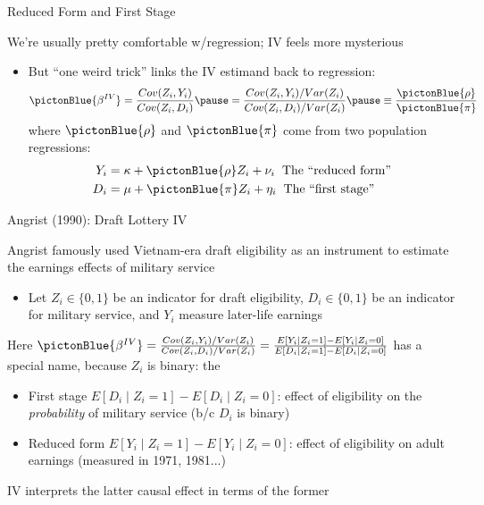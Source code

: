 \documentclass{beamer}
\begin{document}
\begin{frame}{Reduced Form and First Stage}

We're usually pretty comfortable w/regression; IV feels more mysterious\smallskip
\begin{itemize}
\item But ``one weird trick'' links the IV estimand back to regression:
\begin{align*}
\pictonBlue{\beta^{IV}} = \frac{Cov(Z_i,Y_i)}{Cov(Z_i,D_i)} \pause = \frac{Cov(Z_i,Y_i)/Var(Z_i)}{Cov(Z_i,D_i)/Var(Z_i)} \pause \equiv \frac{\pictonBlue{\rho}}{\pictonBlue{\pi}}
\end{align*}
where $\pictonBlue{\rho}$ and $\pictonBlue{\pi}$ come from two population regressions:
\begin{align*}
Y_i &= \kappa+ \pictonBlue{\rho} Z_i + \nu_i \hspace{0.2cm}\text{The ``reduced form''}\\
D_i &= \mu + \pictonBlue{\pi} Z_i + \eta_i\hspace{0.2cm}\text{The ``first stage''}
\end{align*}
\end{itemize}

\end{frame}

\begin{frame}{Angrist (1990): Draft Lottery IV}

Angrist famously used Vietnam-era draft eligibility as an instrument to estimate the earnings effects of military service 
\begin{itemize}
\item Let $Z_i\in\{0,1\}$ be an indicator for draft eligibility, $D_i\in\{0,1\}$ be an indicator for military service, and $Y_i$ measure later-life earnings
\end{itemize}\medskip\pause

Here $\pictonBlue{\beta^{IV}} = \frac{Cov(Z_i,Y_i)/Var(Z_i)}{Cov(Z_i,D_i)/Var(Z_i)} = \frac{E[Y_i\mid Z_i=1]-E[Y_i\mid Z_i=0]}{E[D_i\mid Z_i=1]-E[D_i\mid Z_i=0]}$ has a special name, because $Z_i$ is binary: the \pause{}
\begin{itemize}
\item First stage $E[D_i\mid Z_i=1]-E[D_i\mid Z_i=0]$: effect of eligibility on the \emph{probability} of military service (b/c $D_i$ is binary)
\item Reduced form $E[Y_i\mid Z_i=1]-E[Y_i\mid Z_i=0]$: effect of eligibility on adult earnings (measured in 1971, 1981...)
\end{itemize}\medskip\pause

IV interprets the latter causal effect in terms of the former
\end{frame}
\end{document}
